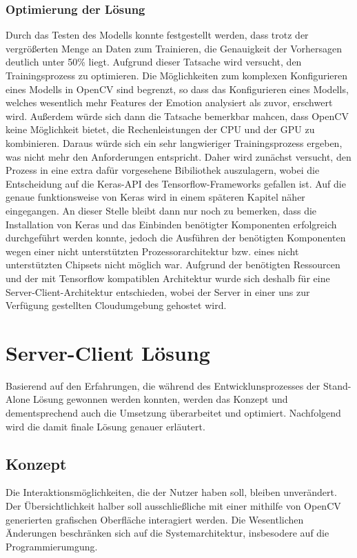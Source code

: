 \documentclass[12pt, a4paper]{scrbook}
\begin{document}
\subsection{Optimierung der Lösung}
Durch das Testen des Modells konnte festgestellt werden, dass trotz der vergrößerten Menge an Daten zum Trainieren, die Genauigkeit der Vorhersagen deutlich unter 50\% liegt. Aufgrund dieser Tatsache wird versucht, den Trainingsprozess zu optimieren. Die Möglichkeiten zum komplexen Konfigurieren eines Modells in OpenCV sind begrenzt, so dass das Konfigurieren eines Modells, welches wesentlich mehr Features der Emotion analysiert als zuvor, erschwert wird. Außerdem würde sich dann die Tatsache bemerkbar mahcen, dass OpenCV keine Möglichkeit bietet, die  Rechenleistungen der CPU und der GPU zu kombinieren. Daraus würde sich ein sehr langwieriger Trainingsprozess ergeben, was nicht mehr den Anforderungen entspricht. Daher wird zunächst versucht, den Prozess in eine extra dafür vorgesehene Bibiliothek auszulagern, wobei die Entscheidung auf die Keras-API des Tensorflow-Frameworks gefallen ist. Auf die genaue funktionsweise von Keras wird in einem späteren Kapitel näher eingegangen. An dieser Stelle bleibt dann nur noch zu bemerken, dass die Installation von Keras und das Einbinden benötigter Komponenten erfolgreich durchgeführt werden konnte, jedoch die Ausführen der benötigten Komponenten wegen einer nicht unterstützten Prozessorarchitektur bzw. eines nicht unterstützten Chipsets nicht möglich war. Aufgrund der benötigten Ressourcen und der mit Tensorflow kompatiblen Architektur wurde sich deshalb für eine Server-Client-Architektur entschieden, wobei der Server in einer uns zur Verfügung gestellten Cloudumgebung gehostet wird.

\chapter{Server-Client Lösung}
Basierend auf den Erfahrungen, die während des Entwicklunsprozesses der Stand-Alone Lösung gewonnen werden konnten, werden das Konzept und dementsprechend auch die Umsetzung überarbeitet und optimiert. Nachfolgend wird die damit finale Lösung genauer erläutert.

\section{Konzept}
Die Interaktionsmöglichkeiten, die der Nutzer haben soll, bleiben unverändert. Der Übersichtlichkeit halber soll ausschließliche mit einer mithilfe von OpenCV generierten grafischen Oberfläche interagiert werden. Die Wesentlichen Änderungen beschränken sich auf die Systemarchitektur, insbesodere auf die Programmierumgung.
\end{document}
